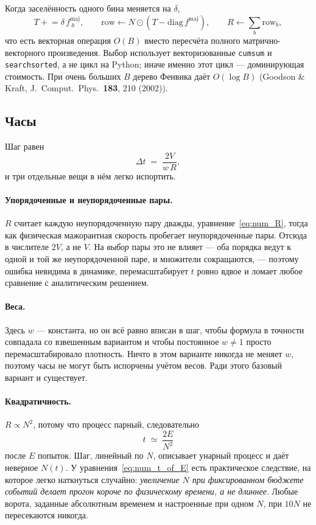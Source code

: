 \documentclass[a4paper,12pt]{article}
\newcommand{\fmaj}{f^{\mathrm{maj}}}
\newcommand{\code}[1]{\texttt{#1}}
\begin{document}
Когда заселённость одного бина меняется на $\delta$,
\[
  T \mathrel{+}= \delta\, \fmaj_{\cdot b},
  \qquad
  \text{row} \gets N \odot (T - \mathrm{diag}\,\fmaj),
  \qquad
  R \gets \textstyle\sum_b \text{row}_b ,
\]
что есть векторная операция $O(B)$ вместо пересчёта полного
матрично-векторного произведения. Выбор использует векторизованные
\code{cumsum} и \code{searchsorted}, а не цикл на Python; иначе именно этот
цикл --- доминирующая стоимость. При очень больших $B$ дерево Фенвика даёт
$O(\log B)$ (Goodson \& Kraft, J.~Comput.\ Phys.\ \textbf{183}, 210 (2002)).

\subsection{Часы}
\label{sec:trick5}

Шаг равен
\begin{equation}
  \Delta t \;=\; \frac{2V}{w\,R},
  \label{eq:num_clock}
\end{equation}
и три отдельные вещи в нём легко испортить.

\paragraph{Упорядоченные и неупорядоченные пары.}
$R$ считает каждую неупорядоченную пару дважды, уравнение~\eqref{eq:num_R},
тогда как физическая мажорантная скорость пробегает неупорядоченные пары.
Отсюда в числителе $2V$, а не $V$. На \emph{выбор} пары это не влияет ---
оба порядка ведут к одной и той же неупорядоченной паре, и множители
сокращаются, --- поэтому ошибка невидима в динамике, перемасштабирует $t$
ровно вдвое и ломает любое сравнение с аналитическим решением.

\paragraph{Веса.}
Здесь $w$ --- константа, но он всё равно вписан в шаг, чтобы формула в
точности совпадала со взвешенным вариантом и чтобы постоянное $w \neq 1$
просто перемасштабировало плотность. Ничто в этом варианте никогда не
меняет $w$, поэтому часы не могут быть испорчены учётом весов. Ради этого
базовый вариант и существует.

\paragraph{Квадратичность.}
$R \propto N^2$, потому что процесс парный, следовательно
\begin{equation}
  t \;\simeq\; \frac{2E}{N^2}
  \label{eq:num_t_of_E}
\end{equation}
после $E$ попыток. Шаг, линейный по $N$, описывает унарный процесс и даёт
неверное $N(t)$. У уравнения~\eqref{eq:num_t_of_E} есть практическое
следствие, на которое легко наткнуться случайно: \emph{увеличение $N$ при
фиксированном бюджете событий делает прогон короче по физическому времени,
а не длиннее}. Любые ворота, заданные абсолютным временем и настроенные при
одном $N$, при $10N$ не пересекаются никогда.
\end{document}
